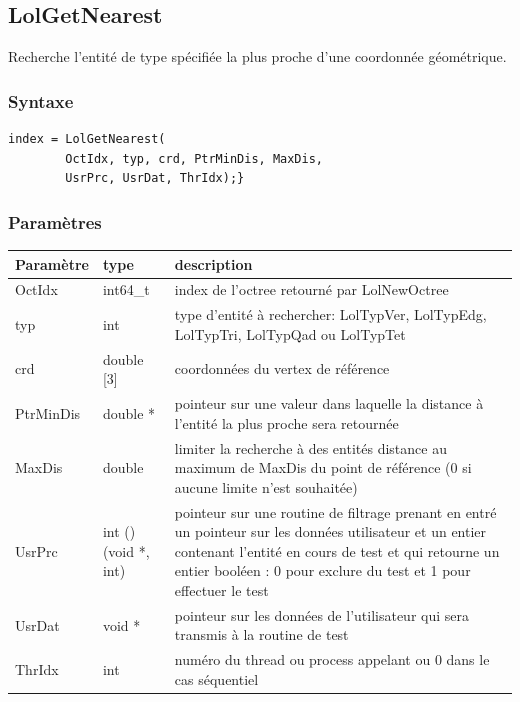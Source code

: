 \documentclass[a4paper,12pt]{article}
\begin{document}
\subsection{LolGetNearest}
Recherche l'entité de type spécifiée la plus proche d'une coordonnée géométrique.

\subsubsection*{Syntaxe}
\begin{tt}
\begin{verbatim}
index = LolGetNearest(
        OctIdx, typ, crd, PtrMinDis, MaxDis,
        UsrPrc, UsrDat, ThrIdx);}
\end{verbatim}
\end{tt}
\normalfont

\subsubsection*{Paramètres}
\begin{tabular}{|m{3cm}|m{2cm}|m{8.5cm}|}
\hline
Paramètre  & type       & description \\
\hline
OctIdx     & int64\_t   & index de l'octree retourné par LolNewOctree \\
\hline
typ        & int        & type d'entité à rechercher: LolTypVer, LolTypEdg, LolTypTri, LolTypQad ou LolTypTet \\
\hline
crd        & double [3] & coordonnées du vertex de référence \\
\hline
PtrMinDis  & double *   & pointeur sur une valeur dans laquelle la distance à l'entité la plus proche sera retournée \\
\hline
MaxDis     & double     & limiter la recherche à des entités distance au maximum de MaxDis du point de référence (0 si aucune limite n'est souhaitée) \\
\hline
UsrPrc     & int ()(void *, int) & pointeur sur une routine de filtrage prenant en entré un pointeur sur les données utilisateur et un entier contenant l'entité en cours de test et qui retourne un entier booléen : 0 pour exclure du test et 1 pour effectuer le test \\
\hline
UsrDat     & void *    & pointeur sur les données de l'utilisateur qui sera transmis à la routine de test \\
\hline
ThrIdx     & int        & numéro du thread ou process appelant ou 0 dans le cas séquentiel \\
\hline
\end{tabular}
\end{document}
